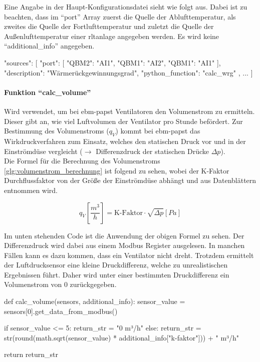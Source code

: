 Eine Angabe in der Haupt-Konfigurationsdatei sieht wie folgt aus. Dabei ist zu beachten, dass im \enquote{port} Array zuerst die Quelle der Ablufttemperatur, als zweites die Quelle der Fortlufttemperatur und zuletzt die Quelle der Außenlufttemperatur einer \acs{rltanlage} angegeben werden. Es wird keine \enquote{additional\_info} angegeben.

\begin{jsoncode}
	"sources": [
	{
		"port": [
			{"QBM2": "AI1"},
			{"QBM1": "AI2"},
			{"QBM1": "AI1"}
		],
		"description": "Wärmerückgewinnungsgrad",
		"python_function": "calc_wrg"
	},
	...
	]
\end{jsoncode}



\paragraph{Funktion \enquote{calc\_volume}}
Wird verwendet, um bei ebm-papst Ventilatoren den Volumenstrom zu ermitteln. Dieser gibt an, wie viel Luftvolumen der Ventilator pro Stunde befördert. Zur Bestimmung des Volumenstroms ($q_{V}$) kommt bei ebm-papst das Wirkdruckverfahren zum Einsatz, welches den statischen Druck vor und in der Einströmdüse vergleicht ($\rightarrow$ Differenzdruck der statischen Drücke $\Delta p$). \\
Die Formel für die Berechnung des Volumenstroms \eqref{glg:volumenstrom_berechnung} ist folgend zu sehen, wobei der K-Faktor \bzw Durchflussfaktor \cite[vgl.][]{rox_klimatechnik:o.J.} von der Größe der Einströmdüse abhängt und aus Datenblättern entnommen wird. \cite[vgl.][171]{ebmpapst:2021}

\begin{equation}
	q_{V}\left[\frac{m^{3}}{h}\right] = \text{K-Faktor} \cdot \sqrt{\Delta p} \left[Pa\right]
	\label{glg:volumenstrom_berechnung}
\end{equation} 

Im unten stehenden Code ist die Anwendung der obigen Formel zu sehen. Der Differenzdruck wird dabei aus einem Modbus Register ausgelesen. In manchen Fällen kann es dazu kommen, dass ein Ventilator nicht dreht. Trotzdem ermittelt der Luftdrucksensor eine kleine Druckdifferenz, welche zu unrealistischen Ergebnissen führt. Daher wird unter einer bestimmten Druckdifferenz ein Volumenstrom von 0 zurückgegeben.

\begin{pythoncode}
def calc_volume(sensors, additional_info):
	sensor_value = sensors[0].get_data_from_modbus()
	
	if sensor_value <= 5:
		return_str = "0 m³/h"
	else:
		return_str = str(round(math.sqrt(sensor_value) * additional_info["k-faktor"])) + " m³/h"
	
	return return_str
\end{pythoncode}

